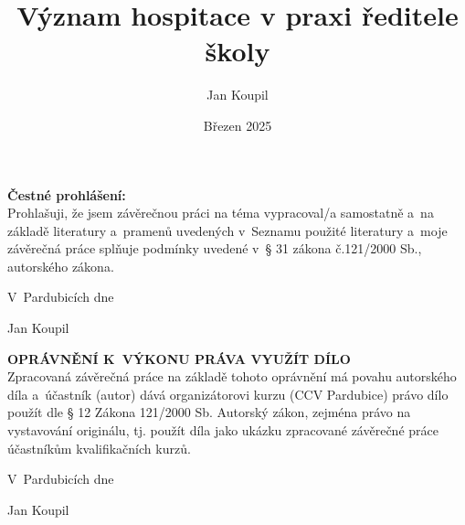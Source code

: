 

\author{Jan Koupil}
\title{Význam hospitace v praxi ředitele školy}
\date{Březen 2025}




\newpage

\setcounter{page}{1}

\vspace*{\fill}

\noindent \textbf{Čestné prohlášení:} \\

Prohlašuji, že jsem závěrečnou práci na téma \textbf{\topic}
vypracoval/a samostatně a~na základě literatury a~pramenů uvedených v~Seznamu použité literatury a~moje závěrečná práce splňuje podmínky uvedené v~§ 31 zákona č.121/2000 Sb., autorského zákona.

\vspace{1cm}

\hfill V~Pardubicích dne \dotfill  
\vspace{1cm}

\hfill
Jan Koupil

\newpage

\vspace*{\fill}

\noindent \textbf{OPRÁVNĚNÍ K~VÝKONU PRÁVA VYUŽÍT DÍLO} \\

Zpracovaná závěrečná práce na základě tohoto oprávnění má povahu autorského díla a~účastník (autor) dává organizátorovi kurzu (CCV Pardubice) právo dílo použít dle § 12 Zákona 121/2000 Sb. Autorský zákon, zejména právo na vystavování originálu, tj. použít díla jako ukázku zpracované závěrečné práce účastníkům kvalifikačních kurzů.

\vspace{1cm}

\hfill V~Pardubicích dne \dotfill  

\hfill
Jan Koupil

\newpage
